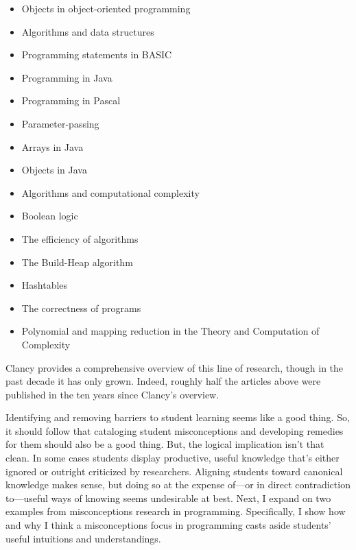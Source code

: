 \begin{itemize}
\tightlist
\item
  Objects in object-oriented programming \cite{holland_avoiding_1997}
\item
  Algorithms and data structures \cite{danielsiek_detecting_2012,paul_hunting_2013}
\item
  Programming statements in BASIC \cite{bayman_diagnosis_1983}
\item
  Programming in Java \cite{fleury_programming_2000}
\item
  Programming in Pascal \cite{fleury_student_1993}
\item
  Parameter-passing \cite{fleury_parameter_1991}
\item
  Arrays in Java \cite{kaczmarczyk_identifying_2010}
\item
  Objects in Java \cite{kaczmarczyk_identifying_2010}
\item
  Algorithms and computational complexity \cite{trakhtenbrot_students_2013}
\item
  Boolean logic \cite{herman_proof_2008}
\item
  The efficiency of algorithms \cite{gal-ezer_efficiency_2004}
\item
  The Build-Heap algorithm \cite{seppala_observations_2006}
\item
  Hashtables \cite{patitsas_countably_2013}
\item
  The correctness of programs \cite{kolikant_my_2008}
\item
  Polynomial and mapping reduction in the Theory and Computation of Complexity \cite{gal-ezer_identification_2016}
\end{itemize}

Clancy \cite{clancy_misconceptions_2004} provides a comprehensive overview of this line of
research, though in the past decade it has only grown. Indeed, roughly
half the articles above were published in the ten years since Clancy's
overview.

Identifying and removing barriers to student learning seems like a good
thing. So, it should follow that cataloging student misconceptions and
developing remedies for them should also be a good thing. But, the
logical implication isn't that clean. In some cases students display
productive, useful knowledge that's either ignored or outright
criticized by researchers. Aligning students toward canonical knowledge
makes sense, but doing so at the expense of---or in direct contradiction
to---useful ways of knowing seems undesirable at best. Next, I expand on
two examples from misconceptions research in programming. Specifically,
I show how and why I think a misconceptions focus in programming casts
aside students' useful intuitions and understandings.

